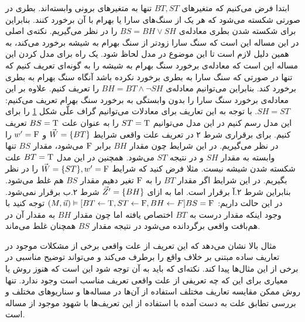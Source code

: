 \begin{figure}
      \centering
      \caption{}
      \label{fig:hp:sb}
\end{figure}
ابتدا فرض می‌کنیم که متغیر‌های
$BT,ST$
تنها به متغیر‌های برونی وابسته‌اند.
بطری در صورتی شکسته می‌شود که هر یک از سنگ‌های سارا یا بهرام با آن برخورد کنند.
بنابراین برای شکسته شدن بطری معادله‌ی
$BS = BH \vee SH$
را در نظر می‌گیریم.
نکته‌ی اصلی در این مساله این است که سنگ سارا زودتر از سنگ بهرام به شیشه برخورد می‌کند، به همین دلیل لازم است تا این موضوع در مدل لحاظ شود.
یک راه برای مدل کردن این مساله این است که معادله‌ی برخورد سنگ بهرام به شیشه را به گونه‌ای تعریف کنیم که تنها در صورتی که سنگ سارا به بطری برخورد نکرده باشد آنگاه سنگ بهرام به بطری برخورد کند.
بنابراین می‌توانیم معادله‌ی
$BH = BT \wedge \neg SH$
را تعریف کنیم.
علاوه بر این معادله‌ی برخورد سنگ سارا را بدون وابستگی به برخورد سنگ بهرام تعریف می‌کنیم:
$SH = ST$.
با توجه به این تعاریف برای معادلات می‌توانیم گراف علّی شکل
\ref{fig:hp:sb}
را برای این مدل رسم کنیم
در این مدل می‌توانیم
$ST = \mathrm{T}$
را به عنوان علت
$BS = \mathrm{T}$
تعریف کنیم.
برای برقراری شرط ۲ در تعریف علت واقعی شرایط
$\vec W = \{BT\}$
و
$w' = \mathrm{F}$
را در نظر می‌گیریم.
در این شرایط چون مقدار
$BH$
برابر
$\mathrm{F}$
می‌شود، مقدار
$BS$
تنها وابسته به مقدار
$SH$
و در نتیجه
$ST$
می‌شود.
همچنین در این مدل
$BT = \mathrm{T}$
علت شکسته شدن شیشه نیست.
مثلا فرض کنید که شرایط
$\vec W = \{ST\},w' = \mathrm{F}$
را در نظر بگیریم.
در این شرایط اگر مقدار
$BT$
را به
$\mathrm{F}$
تغیر دهیم مقدار
$BS$
هم غلط می‌شود.
بنابراین شرط ۲.آ برقرار است.
اما به ازای
$\vec Z' = \{BH\}$
شرط ۲.ب برقرار نمی‌شود.
در این حالت داریم:
$(M,\vec{u})\vDash[BT \leftarrow \mathrm{T},ST \leftarrow \mathrm{F},BH \leftarrow F]BS = \mathrm{F}$
توجه کنید با وجود اینکه مقدار درست به
$BT$
اختصاص یافته اما چون مقدار
$BH$
به مقدار آن در هم‌بافت واقعی برگردانده می‌شود در نتیجه مقدار
$BS$
همچنان غلط می‌ماند.

مثال بالا نشان می‌دهد که این تعریف از علت واقعی برخی از مشکلات موجود در تعاریف ساده مبتنی بر خلاف واقع را برطرف می‌کند و می‌تواند توضیح مناسبی در برخی از این مثال‌ها پیدا کند.
نکته‌ای که باید به آن توجه شود این است که هنوز روش یا معیاری برای این که چه تعریفی از علت واقعی تعریف مناسب است وجود ندارد.
تنها روش ممکن مقایسه تعاریف مختلف استفاده از آن‌ها در مساله‌ها و سناریوهای مختلف و بررسی تطابق علت به دست آمده با استفاده از این تعریف‌ها با شهود موجود از مساله است.

